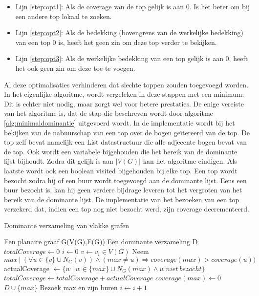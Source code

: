 \documentclass[11pt, a4paper, table]{article}
\makeatletter
\newenvironment{algoritme}[1][H]{%
	\renewcommand{\ALG@name}{Algoritme}%
	\renewcommand{\algorithmicrequire}{\textbf{Input:}}
	\renewcommand{\algorithmicensure}{\textbf{Output:}}
	\begin{algorithm}[#1]%
	}{\end{algorithm}}
\theoremstyle{definition}
\makeatother
\begin{document}
\begin{itemize}
	\item Lijn \ref{step:opt1}: Als de coverage van de top gelijk is aan 0. Is het beter om bij een andere top lokaal te zoeken. 
	\item Lijn \ref{step:opt2}: Als de bedekking (bovengrens van de werkelijke bedekking) van een top 0 is, heeft het geen zin om deze top verder te bekijken. 
	\item Lijn \ref{step:opt3}: Als de werkelijke bedekking van een top gelijk is aan 0, heeft het ook geen zin om deze toe te voegen. 
\end{itemize}
Al deze optimalisaties verhinderen dat slechte toppen zouden toegevoegd worden. In het eigenlijke algoritme, wordt vergeleken in deze stappen met een minimum. Dit is echter niet nodig, maar zorgt wel voor betere prestaties. De enige vereiste van het algoritme is, dat de stap die beschreven wordt door algoritme \ref{alg:minimaldominantie} uitgevoerd wordt. In de implementatie wordt bij het bekijken van de nabuurschap van een top over de bogen ge\"{i}tereerd van de top. De top zelf bevat namelijk een List datastructuur die alle adjecente bogen bevat van de top. Ook wordt een variabele bijgehouden die het bereik van de dominante lijst bijhoudt. Zodra dit gelijk is aan $|V(G)|$ kan het algoritme eindigen. Als laatste wordt ook een boolean visited bijgehouden bij elke top. Een top wordt bezocht zodra hij of een buur wordt toegevoegd aan de dominante lijst. Eens een buur bezocht is, kan hij geen verdere bijdrage leveren tot het vergroten van het bereik van de dominante lijst. De implementatie van het bezoeken van een top verzekerd dat, indien een top nog niet bezocht werd, zijn coverage decrementeerd. 
\begin{tcolorbox}[blanker,float=btp, grow to left by=2cm,grow to right by=2cm]
	\begin{algoritme}
		\caption{Dominante verzameling van vlakke grafen}
		\begin{algorithmic}
			\Require Een planaire graaf G(V(G),E(G))
			\Ensure Een dominante verzameling D
			\State $totalCoverage \gets 0$
			\State $ i \gets 0$
			\State $v \gets v_i \in V(G)$
			\label{step:opt1}
			\State Neem $max\ |\ (\forall u \in \{v\} \cup N_G(v)) \land (max \ne u) \Rightarrow coverage(max)>coverage(u))$
			\label{step:opt2}
			\State actualCoverage $\gets \{w\ |\ w  \in \{max\} \cup N_G(max) \land w\ niet \  bezocht\}$
			\label{step:opt3}
			\State $totalCoverage \gets totalCoverage + actualCoverage$
			\State $coverage(max)  \gets 0$
			\State $ D \cup \{max\}$
			\State Bezoek max en zijn buren
			\EndIf 
			\EndIf
			\EndIf
			\State $i \gets i+1$
			\EndWhile		
		\end{algorithmic}
		\label{alg:minimaldominantie}
	\end{algoritme}
\end{tcolorbox}
\FloatBarrier
\end{document}
